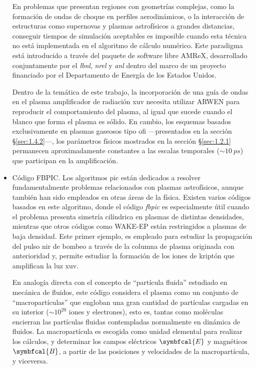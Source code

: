\begin{itemize}
     En problemas que presentan regiones con geometrías complejas, como la formación de ondas de choque en perfiles aerodinámicos, o la interacción de estructuras como supernovas y plasmas astrofísicos a grandes distancias, conseguir tiempos de simulación aceptables es imposible cuando esta técnica no está implementada en el algoritmo de cálculo numérico. Este paradigma está introducido a través del paquete de software libre AMReX\autocite{Zhang2019a}, desarrollado conjuntamente por el \emph{\acrfull{lbnl}}, \emph{\acrfull{nrel}} y \emph{\acrfull{anl}} dentro del marco de un proyecto financiado por el Departamento de Energía de los Estados Unidos.

     Dentro de la temática de este trabajo, la incorporación de una guía de ondas en el plasma amplificador de radiación \acrshort{xuv} necesita utilizar ARWEN para reproducir el comportamiento del plasma\autocite{Oliva2018}, al igual que sucede cuando el blanco que forma el plasma es sólido. En cambio, los esquemas basados exclusivamente en plasmas gaseosos tipo \acrshort{ofi} ---presentados en la sección \S\ref{sec:1.4.2}---, los parámetros físicos mostrados en la sección \S\ref{sec:1.2.1} permanecen aproximadamente constantes a las escalas temporales ($\sim \qty{10}{ps}$) que participan en la amplificación.
    \item Código FBPIC. Los algoritmos \acrfull{pic} están dedicados a resolver fundamentalmente problemas relacionados con plasmas astrofísicos\autocite{Godfrey1974,Kirchen2016}, aunque también han sido empleados en otras áreas de la física. Existen varios códigos basados en este algoritmo, donde el código \emph{\acrfull{fbpic}}\autocite{Lehe2016} es especialmente útil cuando el problema presenta simetría cilíndrica en plasmas de distintas densidades, mientras que otros códigos como WAKE-EP están restringidos a plasmas de baja densidad. Este primer ejemplo, es empleado para estudiar la propagación del pulso \acrshort{nir} de bombeo a través de la columna de plasma originada con anterioridad y, permite estudiar la formación de los iones de kriptón  que amplifican la luz \acrshort{xuv}.

      En analogía directa con el concepto de \enquote{partícula fluida} estudiado en mecánica de fluidos, este código considera el plasma como un conjunto de \enquote{macropartículas} que engloban una gran cantidad de partículas cargadas en su interior ($\sim 10^{20}$ iones y electrones), esto es, tantas como moléculas encierran las partículas fluidas contempladas normalmente en dinámica de fluidos. La macropartícula es escogida como unidad elemental para realizar los cálculos, y determinar los campos eléctricos $\symbfcal{E}$ y magnéticos $\symbfcal{B}$, a partir de las posiciones y velocidades de la macropartícula, y viceversa.


\end{itemize}
